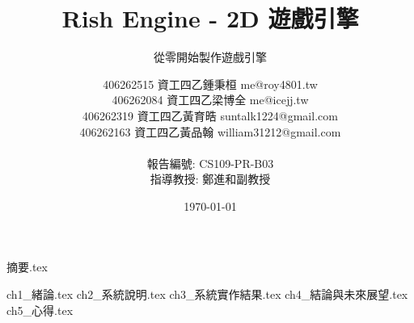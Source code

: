 \documentclass[a4paper, 12pt]{report}
\institute{輔仁大學資訊工程學系專題報告}
\title{Rish Engine - 2D 遊戲引擎}
\subtitle{從零開始製作遊戲引擎}
\author{
    \raggedright
    \hspace{2.5cm} 406262515 資工四乙\enspace 鍾秉桓 me@roy4801.tw \\
    \hspace{2.5cm} 406262084 資工四乙\enspace 梁博全 me@icejj.tw \\
    \hspace{2.5cm} 406262319 資工四乙\enspace 黃育晧 suntalk1224@gmail.com \\
    \hspace{2.5cm} 406262163 資工四乙\enspace 黃品翰 william31212@gmail.com \\
    \ \\
    \centering
    報告編號: CS109-PR-B03 \\
    指導教授: 鄭進和\enspace 副教授 \\
}
\date{\today}
\begin{document}
    \maketitle
    {摘要.tex}

    \romantableofcontents
    \listoffigures
    \listoftables

    {ch1_緒論.tex}
    {ch2_系統說明.tex}
    {ch3_系統實作結果.tex}
    {ch4_結論與未來展望.tex}
    {ch5_心得.tex}

    \printbibliography

\end{document}
